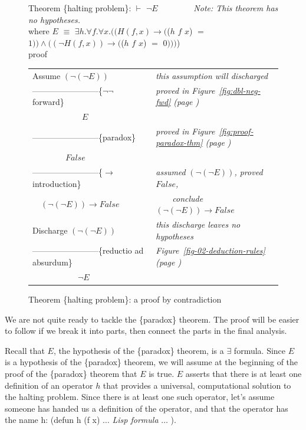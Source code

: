 \begin{figure}
Theorem \{halting problem\}: $\vdash$ $\neg E$ ~~~~~~~~\emph{Note: This theorem has no hypotheses.}\\
\hspace*{5mm}where $E$ $\equiv$ $\exists h. \forall f. \forall x.
((H(f, x) \rightarrow ($\textsf{($h$ $f$ $x$)} $=$ $1)) \wedge ((\neg H(f, x)) \rightarrow ($\textsf{($h$ $f$ $x$)} $=$ $0)))$)\\
proof
\begin{center}
\begin{tabular}{ll}
Assume $(\neg(\neg E))$                       &\emph{this assumption will discharged}\\
------------------------\{$\neg \neg$ forward\} &\emph{proved in Figure~\ref{fig:dbl-neg-fwd} (page \pageref{fig:dbl-neg-fwd})}\\
~~~~~~~~~~~~$E$                               &\\
------------------------\{paradox\}           &\emph{proved in Figure~\ref{fig:proof-paradox-thm} (page \pageref{fig:proof-paradox-thm})}\\
~~~~~~~~$False$                               &\\
------------------------\{$\rightarrow$ introduction\} &\emph{assumed} $(\neg(\neg E))$\emph{, proved} $False$\emph{,}\\
~~$(\neg(\neg E)) \rightarrow False$          &~~~~\emph{conclude} $(\neg(\neg E)) \rightarrow False$\\
Discharge $(\neg(\neg E))$                    &\emph{this discharge leaves no hypotheses}\\
------------------------\{reductio ad absurdum\}&\emph{Figure~\ref{fig-02-deduction-rules} (page \pageref{fig-02-deduction-rules})}\\
~~~~~~~~~~~$\neg E$                           &\\
\end{tabular}
\end{center}
\caption{Theorem \{halting problem\}: a proof by contradiction}
\label{fig:halting-proof-strategy}
\end{figure}

We are not quite ready to tackle the \{paradox\} theorem.
The proof will be easier to follow if we break it into parts,
then connect the parts in the final analysis.

Recall that $E$, the hypothesis of the \{paradox\} theorem,
is a $\exists$ formula.
Since $E$ is a hypothesis of the \{paradox\} theorem,
we will assume at the beginning of the proof
of the \{paradox\} theorem that $E$ is true.
$E$ asserts that there is at least one definition of
an operator $h$ that provides a universal, computational solution
to the halting problem.
Since there is at least one such operator,
let's assume someone has handed us a
definition of the operator, and that the operator has the name \textsf{h}:
\textsf{(defun h (f x)}  $\dots$ \emph{Lisp formula} $\dots$ \textsf{)}.

